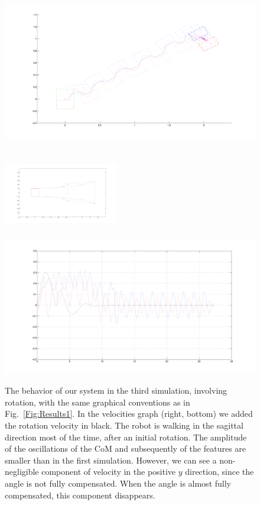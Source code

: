 \begin{figure}[h]
\begin{minipage}{0.5\textwidth}
 \centering
 \includegraphics[scale=.25]{Chap4-Visual-Servoing/steps3_hrp2.pdf}
\end{minipage}
\begin{minipage}{0.5\textwidth}
 \centering
 \includegraphics[width=5cm,height=4cm]{Chap4-Visual-Servoing/features3_hrp2.pdf}
\\
 \includegraphics[scale=.2]{Chap4-Visual-Servoing/vels3_hrp2.pdf}
\end{minipage}
 \caption[]{\label{Fig:Results3}\small{The behavior of our system in the third simulation, involving rotation, with the same graphical conventions as in Fig.~\ref{Fig:Results1}. In the velocities graph (right, bottom) we added the rotation velocity in black. The robot is walking in the sagittal direction most of the time, after an initial rotation. The amplitude of the oscillations of the CoM and subsequently of the features are smaller than in the first simulation. However, we can see a non-negligible component of velocity in the positive $y$ direction, since the angle is not fully compensated. When the angle is almost fully compensated, this component disappears.}}
 \end{figure}

